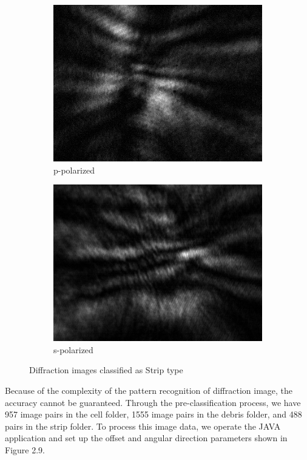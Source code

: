 \begin{figure}[!h]
\begin{subfigure}[b]{0.2\textwidth}
    \includegraphics[width=\textwidth]{diffraction_image/2015040117594700158-1}
    \caption{p-polarized}
  \end{subfigure}
  \begin{subfigure}[b]{0.2\textwidth}
    \includegraphics[width=\textwidth]{diffraction_image/2015040117594700158-2}
    \caption{s-polarized}
  \end{subfigure}
  \caption{Diffraction images classified as Strip type}
\end{figure}
Because of the complexity of the pattern recognition of diffraction image, the accuracy cannot be guaranteed. Through the pre-classification process, we have 957 image pairs in the cell folder, 1555 image pairs in the debris folder, and 488 pairs in the strip folder. To process this image data, we operate the JAVA application and set up the offset and angular direction parameters shown in Figure 2.9. 
